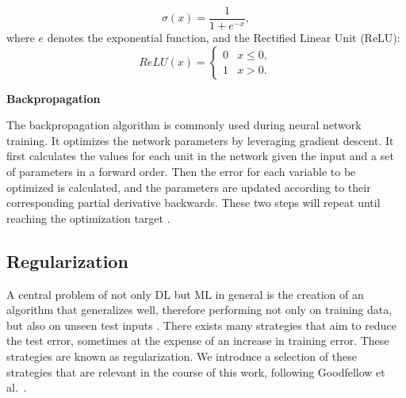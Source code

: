 \begin{equation}
    \sigma (x)= \frac{1}{1+e^{-x}},
\end{equation}
where $e$ denotes the exponential function, and the Rectified Linear Unit (ReLU):
\begin{equation}
    ReLU(x)=\begin{cases}
        0 & x \leq 0, \\
        1 & x > 0.
    \end{cases}
\end{equation}
\bigskip

\textbf{Backpropagation}\par
The backpropagation algorithm \cite{rumelhart1986learning} is commonly used during neural network training. It optimizes the network parameters by leveraging gradient descent. It first calculates the values for each unit in the network given the input and a set of parameters in a forward order. Then the error for each variable to be optimized is calculated, and the parameters are updated according to their corresponding partial derivative backwards. These two steps will repeat until reaching the optimization target \cite{Goodfellow-et-al-2016}.

\subsection{Regularization}
A central problem of not only DL but ML in general is the creation of an algorithm that generalizes well, therefore performing not only on training data, but also on unseen test inputs \cite{Goodfellow-et-al-2016}. There exists many strategies that aim to reduce the test error, sometimes at the expense of an increase in training error. These strategies are known as regularization. We introduce a selection of these strategies that are relevant in the course of this work, following Goodfellow et al.~\cite{Goodfellow-et-al-2016}.\bigskip

